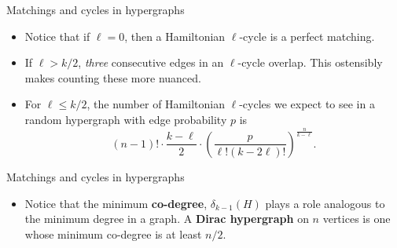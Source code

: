 \documentclass{beamer}
\theoremstyle{plain}
\begin{document}
	\begin{frame}{Matchings and cycles in hypergraphs}
		\begin{itemize}
			\item Notice that if $\ell = 0$, then a Hamiltonian $\ell$-cycle is a perfect matching.

			\pause 
			
			\item If $\ell > k/2$, \emph{three} consecutive edges in an $\ell$-cycle overlap.
			This ostensibly makes counting these more nuanced.

			\pause

			\item For $\ell \leq k/2$, the number of Hamiltonian $\ell$-cycles we expect to see in a random hypergraph with edge probability $p$ is
			\[
				(n-1)!\cdot \frac{k-\ell}{2}\cdot \left(\frac{p}{\ell!(k-2\ell)!}\right)^{\frac{n}{k-\ell}}.
			\]

		\end{itemize}
	\end{frame}
	
	\begin{frame}{Matchings and cycles in hypergraphs}
	    \begin{itemize}
    		\begin{theorem}
    			Let $0\leq \ell < k/2$ and let $1/2 < p \leq 1$.
    			If $(k-\ell)\mid n$ and $\delta_{k-1} \geq pn$, then the number of Hamiltonian $\ell$-cycles in the $k$-uniform hypergraph $H$ is at least
    			\[
    			(1-o(1))^n\cdot n!\cdot \left(\frac{p}{\ell!(k-2\ell)!}\right)^{\frac{n}{k-\ell}}.
    			\]
    		\end{theorem}
    		
    		\pause
    		

    		\item Notice that the minimum \textbf{co-degree}, $\delta_{k-1}(H)$ plays a role analogous to the minimum degree in a graph.
    		A \textbf{Dirac hypergraph} on $n$ vertices is one whose minimum co-degree is at least $n/2$.
		\end{itemize}
	\end{frame}
\end{document}
